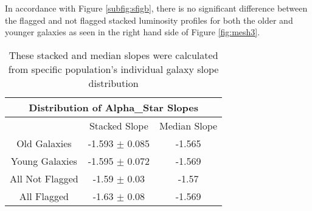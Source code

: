 \documentclass{article}
\begin{document}
In accordance with Figure \ref{subfig:sfigb}, there is no significant difference between the flagged and not flagged stacked luminosity profiles for both the older and younger galaxies as seen in the right hand side of Figure \ref{fig:mesh3}. 

\begin{table}[h!]
\centering
\begin{tabular}{ ||c|c|c|| }
\hline
\multicolumn{3}{||c||}{Distribution of Alpha\_Star Slopes}\\
\hline\hline
   & Stacked Slope & Median Slope \\
\hline
Old Galaxies & -1.593 $\pm$ 0.085 &-1.565 \\
\hline
Young Galaxies &-1.595 $\pm$ 0.072 & -1.569\\
\hline
All Not Flagged & -1.59 $\pm$ 0.03 & -1.57\\
\hline
All Flagged & -1.63 $\pm$ 0.08 & -1.569\\
\hline
\end{tabular}
\caption{These stacked and median slopes were calculated from specific population's individual galaxy slope distribution}
\label{table:2}
\end{table}
\end{document}

